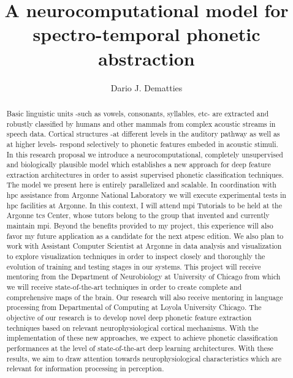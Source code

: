 \documentclass[11pt,a4paper]{article}
\title{A neurocomputational model for spectro-temporal phonetic abstraction}
\author[1]{Dario J. Dematties}
\affil[1]{Instituto de Ingeniería Biomédica, Facultad de Ingeniería, Universidad de Buenos Aires,
Ciudad Autonoma de Buenos Aires, Buenos Aires, Argentina}
\begin{document}


\maketitle

\begin{abstract}
Basic linguistic units -such as vowels, consonants, syllables, etc-
are extracted and robustly classified by humans and other mammals
from complex acoustic streams in speech data.
Cortical structures -at different levels in the auditory pathway as well as at higher levels-
respond selectively to phonetic features embeded in acoustic stimuli.
In this research proposal we introduce a neurocomputational,
completely unsupervised and biologically plausible model
which establishes a new approach for deep feature extraction
architectures in order to assist supervised phonetic classification
techniques.
The model we present here is entirely parallelized and scalable.
In coordination with \gls{hpc} assistance from Argonne National Laboratory
we will execute experimental tests in \gls{hpc} facilities at Argonne.
In this context, I will attend \gls{mpi} Tutorials to be held at
the Argonne \gls{tcs} Center, whose tutors belong to the group
that invented and currently maintain \gls{mpi}.
Beyond the benefits provided to my project,
this experience will also favor my future application as a candidate
for the next \gls{atpesc} edition. 
We also plan to work with Assistant Computer Scientist at Argonne
in data analysis and visualization to explore visualization techniques
in order to inspect closely and thoroughly the evolution of
training and testing stages
in our systems.
This project will receive mentoring from the Department of Neurobiology at
University of Chicago from which we will receive state-of-the-art
techniques in order to create complete and comprehensive maps of the brain.
Our research will also receive mentoring in language processing
from Departmental of Computing at
Loyola University Chicago.
The objective of our research is to develop novel deep phonetic
feature extraction techniques based on relevant neurophysiological
cortical mechanisms.
With the implementation of these new approaches, we expect to
achieve phonetic classification performances at the level of state-of-the-art deep learning architectures. 
With these results, we aim to draw attention 
towards neurophysiological characteristics which are
relevant for information processing in perception.
\end{abstract}
\end{document}
